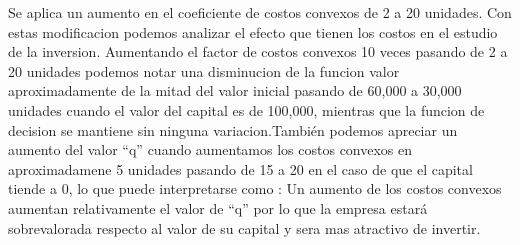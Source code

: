 \documentclass[
]{book}
\begin{document}
Se aplica un aumento en el coeficiente de costos convexos de 2 a 20
unidades. Con estas modificacion podemos analizar el efecto que tienen
los costos en el estudio de la inversion. Aumentando el factor de costos
convexos 10 veces pasando de 2 a 20 unidades podemos notar una
disminucion de la funcion valor aproximadamente de la mitad del valor
inicial pasando de 60,000 a 30,000 unidades cuando el valor del capital
es de 100,000, mientras que la funcion de decision se mantiene sin
ninguna variacion.También podemos apreciar un aumento del valor ``q''
cuando aumentamos los costos convexos en aproximadamene 5 unidades
pasando de 15 a 20 en el caso de que el capital tiende a 0, lo que puede
interpretarse como : Un aumento de los costos convexos aumentan
relativamente el valor de ``q'' por lo que la empresa estará
sobrevalorada respecto al valor de su capital y sera mas atractivo de
invertir.

\backmatter
\end{document}
